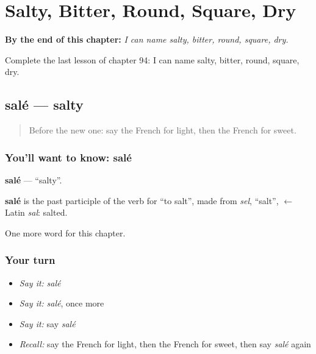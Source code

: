 
\chapter{Salty, Bitter, Round, Square, Dry}
\label{ch:fr-salty-bitter-round-square-dry}

\begin{chapteropening}
\textbf{By the end of this chapter:} \emph{I can name salty, bitter, round, square, dry.}

Complete the last lesson of chapter 94: I can name salty, bitter, round, square, dry.
\end{chapteropening}

\section[salé]{salé — salty}

\label{lesson:FR-C94-sale}



\begin{quote}
Before the new one: say the French for light, then the French for sweet.
\end{quote}

\subsection*{You'll want to know: salé}
\textbf{salé} — \textquotedblleft{}salty\textquotedblright{}.

\begin{cousinweb}
\textbf{salé} is the past participle of the verb for \textquotedblleft{}to salt\textquotedblright{}, made from \emph{sel}, \textquotedblleft{}salt\textquotedblright{}, $\leftarrow$ Latin \emph{sal}: salted.
\end{cousinweb}

\begin{grammarlens}[title={What you've built}]
One more word for this chapter.
\end{grammarlens}

\subsection*{Your turn}
\begin{itemize}
\raggedright
  \item \emph{Say it:} \emph{salé}
  \item \emph{Say it:} \emph{salé}, once more
  \item \emph{Say it:} say \emph{salé}
  \item \emph{Recall:} say the French for light, then the French for sweet, then say \emph{salé} again
\end{itemize}

